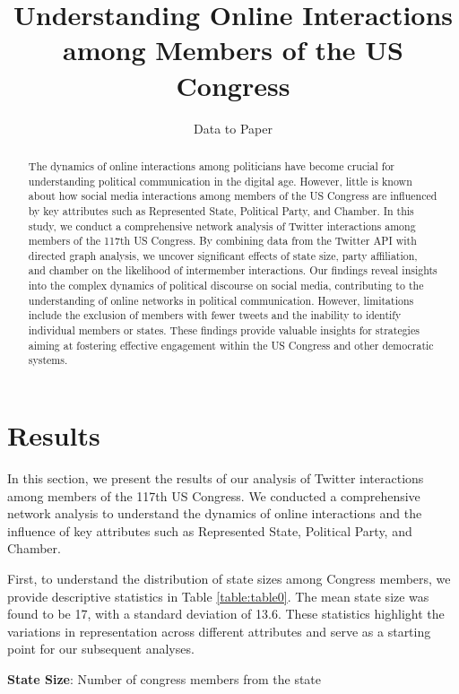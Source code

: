 \documentclass[11pt]{article}
\title{Understanding Online Interactions among Members of the US Congress}
\author{Data to Paper}
\begin{document}
\maketitle
\begin{abstract}
The dynamics of online interactions among politicians have become crucial for understanding political communication in the digital age. However, little is known about how social media interactions among members of the US Congress are influenced by key attributes such as Represented State, Political Party, and Chamber. In this study, we conduct a comprehensive network analysis of Twitter interactions among members of the 117th US Congress. By combining data from the Twitter API with directed graph analysis, we uncover significant effects of state size, party affiliation, and chamber on the likelihood of intermember interactions. Our findings reveal insights into the complex dynamics of political discourse on social media, contributing to the understanding of online networks in political communication. However, limitations include the exclusion of members with fewer tweets and the inability to identify individual members or states. These findings provide valuable insights for strategies aiming at fostering effective engagement within the US Congress and other democratic systems.
\end{abstract}
\section*{Results}\label{sec:results}

In this section, we present the results of our analysis of Twitter interactions among members of the 117th US Congress. We conducted a comprehensive network analysis to understand the dynamics of online interactions and the influence of key attributes such as Represented State, Political Party, and Chamber.

First, to understand the distribution of state sizes among Congress members, we provide descriptive statistics in Table \ref{table:table0}. The mean state size was found to be 17, with a standard deviation of 13.6. These statistics highlight the variations in representation across different attributes and serve as a starting point for our subsequent analyses.

\begin{table}[h]
\caption{Descriptive statistics of state size.}
\label{table:table0}
\begin{threeparttable}
\renewcommand{\TPTminimum}{\linewidth}
\begin{tablenotes}
\footnotesize
\item \textbf{State Size}: Number of congress members from the state
\end{tablenotes}
\end{threeparttable}
\end{table}
\end{document}
